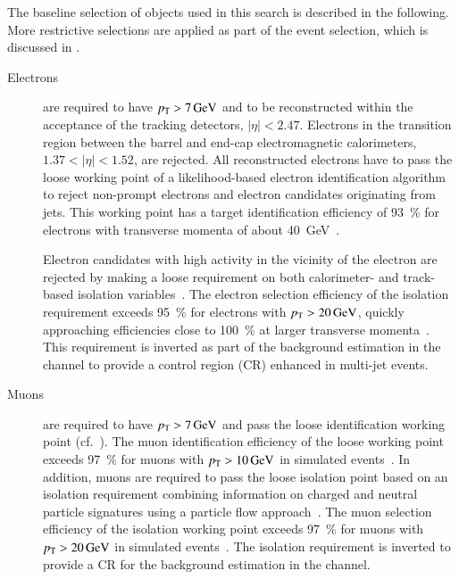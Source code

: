The baseline selection of objects used in this search is described in the
following. More restrictive selections are applied as part of the event
selection, which is discussed in .
\begin{description}

\item[Electrons] are required to have $\pT > \SI{7}{\GeV}$ and to be
  reconstructed within the acceptance of the tracking detectors,
  $|\eta| < \num{2.47}$. Electrons in the transition region between the barrel
  and end-cap electromagnetic calorimeters, $1.37 < |\eta| < 1.52$, are
  rejected. All reconstructed electrons have to pass the loose working point of
  a likelihood-based electron identification algorithm to reject non-prompt
  electrons and electron candidates originating from jets. This working point
  has a target identification efficiency of \SI{93}{\percent} for electrons with
  transverse momenta of about \SI{40}{\GeV}~\cite{EGAM-2018-01,PERF-2017-01}.

  Electron candidates with high activity in the vicinity of the electron are
  rejected by making a loose requirement on both calorimeter- and track-based
  isolation variables~\cite{EGAM-2018-01}.
  The electron selection efficiency of the isolation requirement exceeds
  \SI{95}{\percent} for electrons with $\pT > \SI{20}{\GeV}$, quickly
  approaching efficiencies close to \SI{100}{\percent} at larger transverse
  momenta~\cite{EGAM-2018-01}. This requirement is inverted as part of the
  \faketauhadvis background estimation in the \lephad channel to provide a
  control region (CR) enhanced in multi-jet events.

\item[Muons] are required to have $\pT > \SI{7}{\GeV}$ and pass the loose
  identification working point (cf.~). The muon
  identification efficiency of the loose working point exceeds \SI{97}{\percent}
  for muons with $\pT > \SI{10}{\GeV}$ in simulated \ttbar
  events~\cite{MUON-2018-03}. In addition, muons are required to pass the loose
  isolation point based on an isolation requirement combining information on
  charged and neutral particle signatures using a particle flow
  approach~\cite{MUON-2018-03}. The muon selection efficiency of the isolation
  working point exceeds \SI{97}{\percent} for muons with $\pT > \SI{20}{\GeV}$
  in simulated \ttbar events~\cite{MUON-2018-03}. The isolation requirement is
  inverted to provide a CR for the \faketauhadvis background estimation in the
  \lephad channel.


\end{description}
